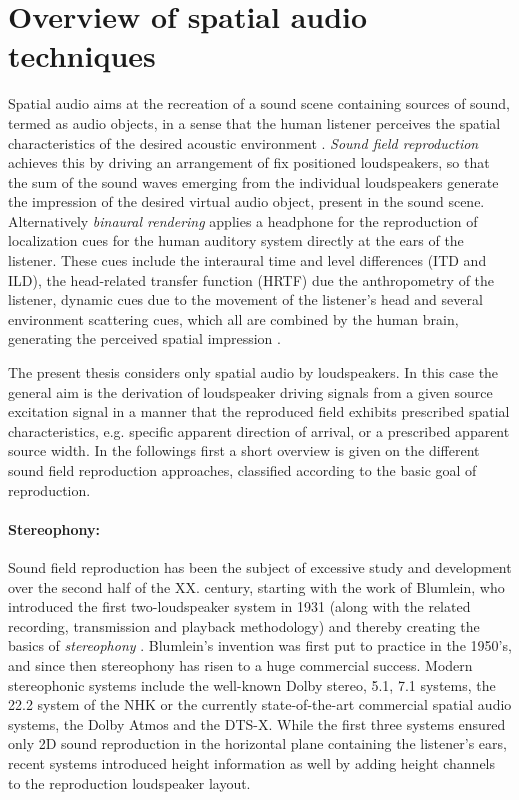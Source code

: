 \section{Overview of spatial audio techniques}
Spatial audio aims at the recreation of a sound scene containing sources of sound, termed as audio objects, in a sense that the human listener perceives the spatial characteristics of the desired acoustic environment \cite{Zhang2017}.
\emph{Sound field reproduction} achieves this by driving an arrangement of fix positioned loudspeakers, so that the sum of the sound waves emerging from the individual loudspeakers generate the impression of the desired virtual audio object, present in the sound scene.
Alternatively \emph{binaural rendering} applies a headphone for the reproduction of localization cues for the human auditory system directly at the ears of the listener.
These cues include the interaural time and level differences (ITD and ILD), the head-related transfer function (HRTF) due the anthropometry of the listener, dynamic cues due to the movement of the listener's head and several environment scattering cues, which all are combined by the human brain, generating the perceived spatial impression \cite{Blauert1983}.

The present thesis considers only spatial audio by loudspeakers.
In this case the general aim is the derivation of loudspeaker driving signals from a given source excitation signal in a manner that the reproduced field exhibits prescribed spatial characteristics, e.g. specific apparent direction of arrival, or a prescribed apparent source width.
In the followings first a short overview is given on the different sound field reproduction approaches, classified according to the basic goal of reproduction.

\paragraph{Stereophony:}
Sound field reproduction has been the subject of excessive study and development over the second half of the XX. century, starting with the work of Blumlein, who introduced the first two-loudspeaker system in 1931 (along with the related recording, transmission and playback methodology) and thereby creating the basics of \emph{stereophony} \cite{Blumlein1932, Alexander2000}.
Blumlein's invention was first put to practice in the 1950's, and since then stereophony has risen to a huge commercial success.
Modern stereophonic systems include the well-known Dolby stereo, 5.1, 7.1 systems, the 22.2 system of the NHK \cite{hamasaki2005the, hamasaki2011the} or the currently state-of-the-art commercial spatial audio systems, the Dolby Atmos \cite{Atmos} and the DTS-X.
While the first three systems ensured only 2D sound reproduction in the horizontal plane containing the listener's ears, recent systems introduced height information as well by adding height channels to the reproduction loudspeaker layout.

